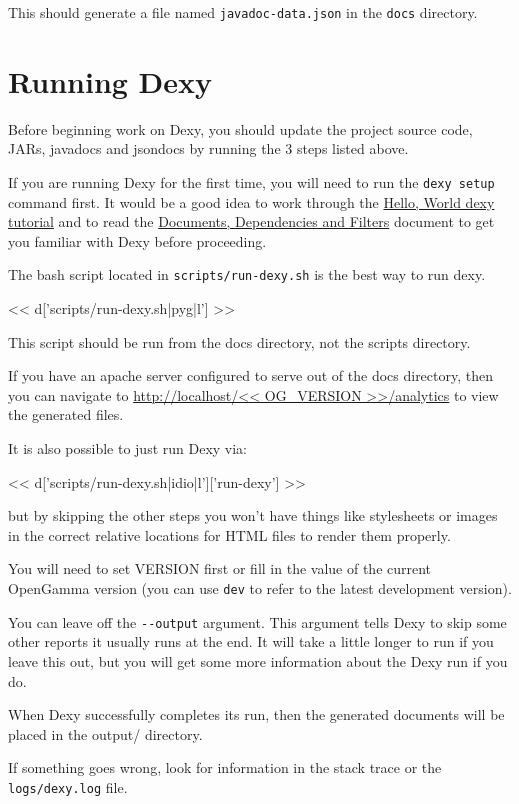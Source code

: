 This should generate a file named \verb|javadoc-data.json| in the
\verb|docs| directory.

\section{Running Dexy}

Before beginning work on Dexy, you should update the project source code, JARs,
javadocs and jsondocs by running the 3 steps listed above.

If you are running Dexy for the first time, you will need to run the \verb|dexy setup|
command first. It would be a good idea to work through the
\href{http://www.dexy.it/docs/tutorials/0-hello-world/}{Hello, World dexy tutorial}
and to read the \href{http://www.dexy.it/docs/guide/documents-dependencies-and-filters/}{Documents, Dependencies and Filters}
document to get you familiar with Dexy before proceeding.

The bash script located in \verb|scripts/run-dexy.sh| is the best way to run dexy.

<< d['scripts/run-dexy.sh|pyg|l'] >>

This script should be run from the docs directory, not the scripts directory.

If you have an apache server configured to serve out of the
docs directory, then you can navigate to
\url{http://localhost/<< OG_VERSION >>/analytics} to view
the generated files.

It is also possible to just run Dexy via:

<< d['scripts/run-dexy.sh|idio|l']['run-dexy'] >>

but by skipping the other steps you won't have things like stylesheets or
images in the correct relative locations for HTML files to render them
properly.

You will need to set VERSION first or fill in the value of the current
OpenGamma version (you can use \verb|dev| to refer to the latest development
version).

You can leave off the \verb|--output| argument. This argument tells Dexy to
skip some other reports it usually runs at the end. It will take a little
longer to run if you leave this out, but you will get some more information
about the Dexy run if you do.

When Dexy successfully completes its run, then the generated documents will be
placed in the output/ directory.

If something goes wrong, look for information in the stack trace or the
\verb|logs/dexy.log| file.

